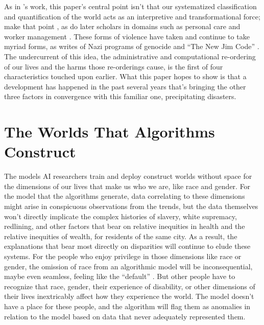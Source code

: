 \documentclass[manuscript,screen]{acmart}
\begin{document}
As in \citeauthor{scott1998seeing}'s work, this paper's central point isn't that our systematized classification and quantification of the world acts as an interpretive and transformational force;
\citeauthor{bowker2000sorting} make that point \cite{bowker2000sorting}, as do later scholars in domains such as personal care
\cite{10.1145/3274362} and worker management
\cite{turkopticon}.
These forms of violence have taken and continue to take myriad forms, as \citeauthor{hoffmann2020terms} writes of Nazi programs of genocide and ``The New Jim Code''
\cite{hoffmann2020terms}.
The undercurrent of this idea, the administrative and computational re-ordering of our lives and the harms those re-orderings cause, is the first of four characteristics \citeauthor{scott1998seeing} touched upon earlier.
What this paper hopes to show is that a development has happened in the past several years that's bringing the other three factors in convergence with this familiar one, precipitating disasters.

\section{The Worlds That Algorithms Construct}

The models AI researchers train and deploy construct worlds without space for the dimensions of our lives that make us who we are, like race and gender.
For the model that the algorithms generate, data correlating to these dimensions might arise in conspicuous observations from the trends, but the data themselves won't directly implicate the complex histories of slavery, white supremacy, redlining, and other factors that bear on relative inequities in health and the relative inequities of wealth, for residents of the same city.
As a result, the explanations that bear most directly on disparities will continue to elude these systems.
For the people who enjoy privilege in those dimensions like race or gender, the omission of race from an algorithmic model will be inconsequential, maybe even seamless, feeling like the ``default''
\cite{sweeney2019technically}.
But other people have to recognize that race, gender, their experience of disability, or other dimensions of their lives inextricably affect how they experience the world.
The model doesn't have a place for these people, and the algorithm will flag them as anomalies in relation to the model based on data that never adequately represented them.
\end{document}
